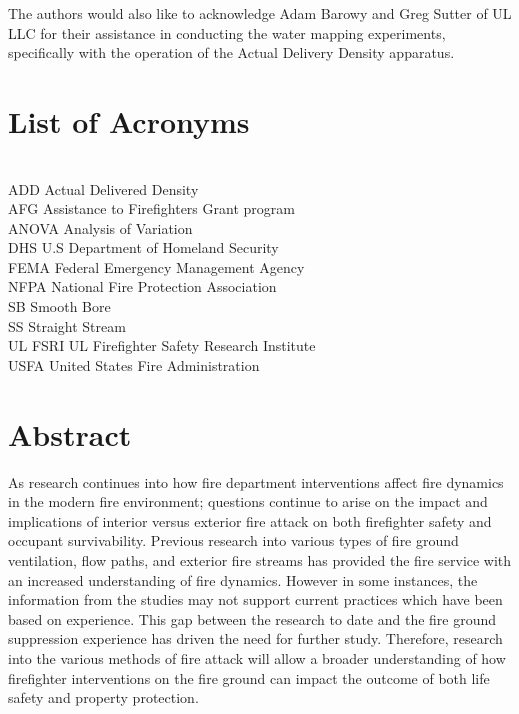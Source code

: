 \documentclass[12pt,oneside]{book}
\begin{document}
The authors would also like to acknowledge Adam Barowy and Greg Sutter of UL LLC for their assistance in conducting the water mapping experiments, specifically with the operation of the Actual Delivery Density apparatus.

\cleardoublepage
{}
{}
\tableofcontents

\cleardoublepage
{}
{}
\listoffigures

\cleardoublepage
{}
{}
\listoftables

\chapter{List of Acronyms}

\begin{tabbing}
\hspace{1.5in} \= \\
ADD \> Actual Delivered Density \\
AFG \> Assistance to Firefighters Grant program  \\
ANOVA \> Analysis of Variation \\
DHS \> U.S Department of Homeland Security   \\   
FEMA \> Federal Emergency Management Agency  \\
NFPA \> National Fire Protection Association \\
SB \> Smooth Bore \\
SS \> Straight Stream \\
UL FSRI \> UL Firefighter Safety Research Institute \\
USFA \> United States Fire Administration  \\
\end{tabbing}

\newpage

\mainmatter

\chapter*{\centering Abstract}

As research continues into how fire department interventions affect fire dynamics in the modern fire environment; questions continue to arise on the impact and implications of interior versus exterior fire attack on both firefighter safety and occupant survivability. Previous research into various types of fire ground ventilation, flow paths, and exterior fire streams has provided the fire service with an increased understanding of fire dynamics. However in some instances, the information from the studies may not support current practices which have been based on experience. This gap between the research to date and the fire ground suppression experience has driven the need for further study. Therefore, research into the various methods of fire attack will allow a broader understanding of how firefighter interventions on the fire ground can impact the outcome of both life safety and property protection. 
\end{document}
